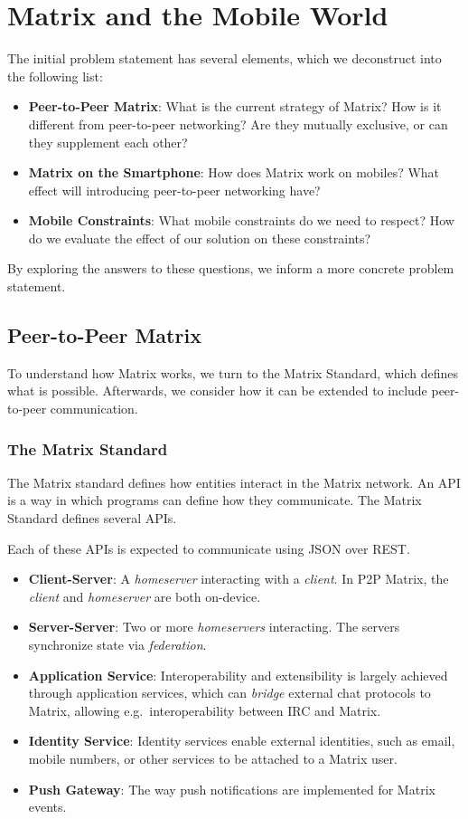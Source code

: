 \chapter{Matrix and the Mobile World}
The initial problem statement has several elements, which we deconstruct into the following list:
\begin{itemize}
	\item{
	      \textbf{Peer-to-Peer Matrix}:
	      What is the current strategy of Matrix?
	      How is it different from peer-to-peer networking?
	      Are they mutually exclusive, or can they supplement each other?
	      }
	\item{
	      \textbf{Matrix on the Smartphone}:
	      How does Matrix work on mobiles?
	      What effect will introducing peer-to-peer networking have?
	      }
	\item{
	      \textbf{Mobile Constraints}:
	      What mobile constraints do we need to respect?
	      How do we evaluate the effect of our solution on these constraints?
	      }
\end{itemize}

By exploring the answers to these questions, we inform a more concrete problem statement.

\section{Peer-to-Peer Matrix}
To understand how Matrix works, we turn to the Matrix Standard, which defines what is possible.
Afterwards, we consider how it can be extended to include peer-to-peer communication.

\subsection{The Matrix Standard}
The Matrix standard defines how entities interact in the Matrix network.
An \ac{API} is a way in which programs can define how they communicate.
The Matrix Standard defines several \ac{API}s.

Each of these \ac{API}s is expected to communicate using \ac{JSON} over \ac{REST}.
\begin{itemize}
	\item \textbf{Client-Server}:
	      A \textit{homeserver} interacting with a \textit{client}.
	      In \ac{P2P} Matrix, the \textit{client} and \textit{homeserver} are both on-device.
	\item \textbf{Server-Server}:
	      Two or more \textit{homeservers} interacting.
	      The servers synchronize state via \textit{federation}.
	\item \textbf{Application Service}:
	      Interoperability and extensibility is largely achieved through application services, which can \textit{bridge} external chat protocols to Matrix, allowing e.g.~interoperability between \ac{IRC} and Matrix.
	\item \textbf{Identity Service}:
	      Identity services enable external identities, such as email, mobile numbers, or other services to be attached to a Matrix user.
	\item \textbf{Push Gateway}:
	      The way push notifications are implemented for Matrix events.
\end{itemize}

